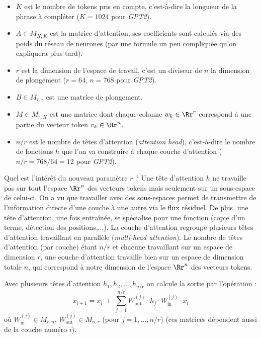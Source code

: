 \documentclass[11pt,class=report,crop=false]{standalone}
\begin{document}
\begin{itemize}
	\item $K$ est le nombre de tokens pris en compte, c'est-à-dire la longueur de la phrase à compléter ($K = 1024$ pour \emph{GPT2}).
	
	\item $A \in M_{K,K}$ est la matrice d'attention, ses coefficients sont calculés via des poids du réseau de neurones (par une formule un peu compliquée qu'on expliquera plus tard).
	
	\item $r$ est la dimension de l'espace de travail, c'est un diviseur de $n$ la dimension de plongement ($r=64$, $n=768$ pour \emph{GPT2}).
	
	\item $B \in M_{r,r}$ est une matrice de plongement.
	
	\item $M \in M_{r,K}$ est une matrice dont chaque colonne $w_k \in \Rr^r$ correspond à une partie du vecteur token $v_k \in \Rr^n$.
	
	\item $n/r$ est le nombre de têtes d'attention (\emph{attention head}), c'est-à-dire le nombre de fonctions $h$ que l'on va construire à chaque couche d'attention ($n/r = 768/64 = 12$ pour \emph{GPT2}).
\end{itemize}

Quel est l'intérêt du nouveau paramètre $r$ ? 
Une tête d'attention $h$ ne travaille pas sur tout l'espace $\Rr^n$ des vecteurs tokens mais seulement sur un sous-espace de celui-ci. On a vu que travailler avec des sous-espaces permet de transmettre de l'information directe d'une couche à une autre via le flux résiduel.
De plus, une tête d'attention, une fois entraînée, se spécialise pour une fonction (copie d'un terme, détection des positions,...). La couche d'attention regroupe plusieurs têtes d'attention travaillant en parallèle (\emph{multi-head attention}). Le nombre de têtes d'attention (par couche) étant $n/r$ et chacune travaillant sur un espace de dimension $r$, une couche d'attention travaille bien sur un espace de dimension totale $n$, qui correspond à notre dimension de l'espace $\Rr^n$ des vecteurs tokens.

Avec plusieurs têtes d'attention $h_1,h_2,\ldots,h_{n/r}$ on calcule la sortie par l'opération :
$$x_{i+1} = x_i \ + \ \sum_{j=1}^{n/r} W_{\text{out}}^{(j)} \cdot h_j \cdot  W_{\text{in}}^{(j)} \cdot x_i$$
où $W_{\text{in}}^{(j)} \in M_{r,n}$, $W_{\text{out}}^{(j)} \in M_{n,r}$ (pour $j=1,\ldots,n/r$) (ces matrices dépendent aussi de la couche numéro $i$).
\end{document}
